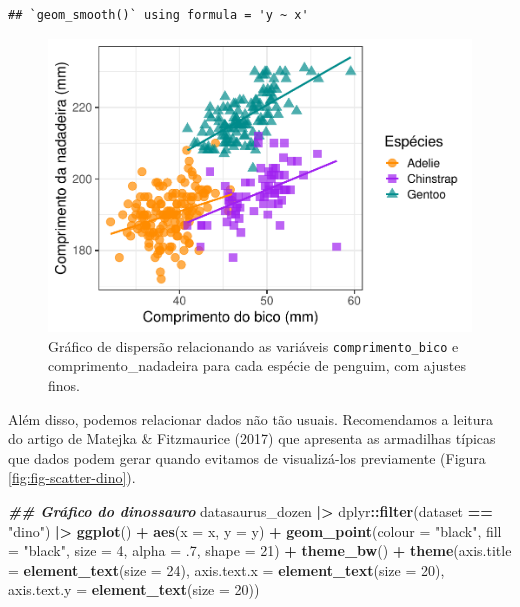 \documentclass[
]{article}
\newenvironment{Shaded}{\begin{snugshade}}{\end{snugshade}}
\newcommand{\AttributeTok}[1]{\textcolor[rgb]{0.13,0.29,0.53}{#1}}
\newcommand{\DecValTok}[1]{\textcolor[rgb]{0.00,0.00,0.81}{#1}}
\newcommand{\DocumentationTok}[1]{\textcolor[rgb]{0.56,0.35,0.01}{\textbf{\textit{#1}}}}
\newcommand{\FunctionTok}[1]{\textcolor[rgb]{0.13,0.29,0.53}{\textbf{#1}}}
\newcommand{\NormalTok}[1]{#1}
\newcommand{\SpecialCharTok}[1]{\textcolor[rgb]{0.81,0.36,0.00}{\textbf{#1}}}
\newcommand{\StringTok}[1]{\textcolor[rgb]{0.31,0.60,0.02}{#1}}
\begin{document}
\begin{verbatim}
## `geom_smooth()` using formula = 'y ~ x'
\end{verbatim}

\begin{figure}
\centering
\includegraphics{epr_files/figure-latex/fig-scatter-fino-1.pdf}
\caption{\label{fig:fig-scatter-fino}Gráfico de dispersão relacionando as variáveis \texttt{comprimento\_bico} e comprimento\_nadadeira para cada espécie de penguim, com ajustes finos.}
\end{figure}

Além disso, podemos relacionar dados não tão usuais. Recomendamos a leitura do artigo de Matejka \& Fitzmaurice (2017) que apresenta as armadilhas típicas que dados podem gerar quando evitamos de visualizá-los previamente (Figura \ref{fig:fig-scatter-dino}).

\begin{Shaded}
\begin{Highlighting}[]
\DocumentationTok{\#\# Gráfico do dinossauro}
\NormalTok{datasaurus\_dozen }\SpecialCharTok{|\textgreater{}} 
\NormalTok{    dplyr}\SpecialCharTok{::}\FunctionTok{filter}\NormalTok{(dataset }\SpecialCharTok{==} \StringTok{"dino"}\NormalTok{) }\SpecialCharTok{|\textgreater{}} 
    \FunctionTok{ggplot}\NormalTok{() }\SpecialCharTok{+}
    \FunctionTok{aes}\NormalTok{(}\AttributeTok{x =}\NormalTok{ x, }\AttributeTok{y =}\NormalTok{ y) }\SpecialCharTok{+}
    \FunctionTok{geom\_point}\NormalTok{(}\AttributeTok{colour =} \StringTok{"black"}\NormalTok{, }\AttributeTok{fill =} \StringTok{"black"}\NormalTok{, }
               \AttributeTok{size =} \DecValTok{4}\NormalTok{, }\AttributeTok{alpha =}\NormalTok{ .}\DecValTok{7}\NormalTok{, }\AttributeTok{shape =} \DecValTok{21}\NormalTok{) }\SpecialCharTok{+}
    \FunctionTok{theme\_bw}\NormalTok{() }\SpecialCharTok{+}
    \FunctionTok{theme}\NormalTok{(}\AttributeTok{axis.title =} \FunctionTok{element\_text}\NormalTok{(}\AttributeTok{size =} \DecValTok{24}\NormalTok{),}
          \AttributeTok{axis.text.x =} \FunctionTok{element\_text}\NormalTok{(}\AttributeTok{size =} \DecValTok{20}\NormalTok{),}
          \AttributeTok{axis.text.y =} \FunctionTok{element\_text}\NormalTok{(}\AttributeTok{size =} \DecValTok{20}\NormalTok{))}
\end{Highlighting}
\end{Shaded}
\end{document}
